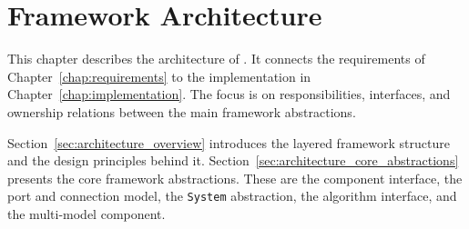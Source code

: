 \chapter{Framework Architecture}
\label{chap:architecture}

This chapter describes the architecture of \syssimx{}.
It connects the requirements of Chapter~\ref{chap:requirements} to the implementation in Chapter~\ref{chap:implementation}.
The focus is on responsibilities, interfaces, and ownership relations between the main framework abstractions.

Section~\ref{sec:architecture_overview} introduces the layered framework structure and the design principles behind it.
Section~\ref{sec:architecture_core_abstractions} presents the core framework abstractions.
These are the component interface, the port and connection model, the \texttt{System} abstraction, the algorithm interface, and the multi-model component.


